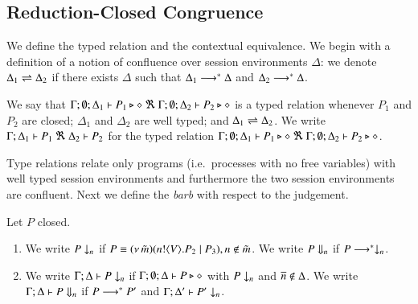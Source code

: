 \subsection{Reduction-Closed Congruence}
\label{subsec:rc}
\noi We define the typed relation and the contextual equivalence.  
We begin with a definition of a notion of confluence
over session environments $\Delta$:
we denote $\Delta_1 \rightleftharpoons \Delta_2$ if there exists $\Delta$ such that
	$\Delta_1 \longrightarrow^\ast \Delta$ and $\Delta_2 \longrightarrow^\ast \Delta$.

\smallskip 

\begin{definition}\rm
	We say that
	$\Gamma; \emptyset; \Delta_1 \vdash P_1 \triangleright \diamond\ \Re \ \Gamma; \emptyset; \Delta_2 \vdash P_2 \triangleright \diamond$
	is a typed relation whenever $P_1$ and $P_2$ are closed;
		$\Delta_1$ and $\Delta_2$ are well typed; and 
		$\Delta_1 \rightleftharpoons \Delta_2$.
We write
$\horel{\Gamma}{\Delta_1}{P_1}{\ \Re \ }{\Delta_2}{P_2}$
for the typed relation $\Gamma; \emptyset; \Delta_1 \vdash P_1 \triangleright \diamond\ \Re \ \Gamma; \emptyset; \Delta_2 \vdash P_2 \triangleright \diamond$.
\end{definition}

\smallskip 

Type relations relate only programs (i.e.\ processes with no free variables) with
well typed session environments and furthermore the two session environments
are confluent.
Next we define the {\em barb} \cite{MiSa92} 
with respect to the judgement. 

\smallskip 

\begin{definition}[Barbs]\rm
Let $P$ closed.
\begin{enumerate}
		\item	We write $P \downarrow_{n}$ if $P \equiv (\nu\, \tilde{m})(n ! \langle V \rangle . P_2 \;|\; P_3), n \notin \tilde{m}$.
			We write $P \Downarrow_{n}$ if $P \longrightarrow^* \downarrow_{n}$.

		\item	We write $\Gamma; \Delta \vdash P \downarrow_{n}$ if
			$\Gamma; \emptyset; \Delta \vdash P \triangleright \diamond$ with $P \downarrow_{n}$ and $\overline{n} \notin \Delta$.
			We write $\Gamma; \Delta \vdash P \Downarrow_{n}$ if $P \longrightarrow^* P'$ and
			$\Gamma; \Delta' \vdash P' \downarrow_{n}$.			
	\end{enumerate}
\end{definition}

